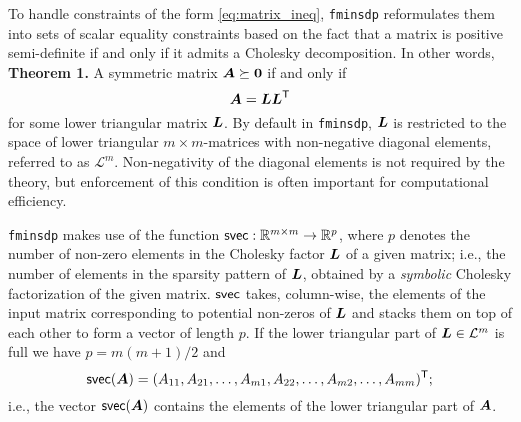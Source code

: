 \documentclass{article}
\newcommand{\bm}[1]{\mbox{\boldmath $#1$}}
\newcommand{\T}{\textsf{T}}
\newcommand{\svec}{\mbox{\textsf{svec}}}
\begin{document}
To handle constraints of the form \eqref{eq:matrix_ineq}, \texttt{fminsdp} reformulates them into sets of scalar equality constraints based on the fact that a matrix is positive semi-definite if and only if it admits a Cholesky decomposition. In other words, 
\vskip 2mm
\noindent \textbf{Theorem 1.} A symmetric matrix $\bm{A} \succeq \bm{0}$ if and only if
\begin{equation}\nonumber
\bm{A} = \bm{L}\bm{L}^{\T}
\end{equation}
for some lower triangular matrix $\bm{L}$. 
\vskip 2mm
\noindent By default in \texttt{fminsdp}, $\bm{L}$ is restricted to the space of lower triangular $m \times m$-matrices with non-negative diagonal elements, referred to as $\mathcal{L}^{m}$. Non-negativity of the diagonal elements is not required by the theory, but enforcement of this condition is often important for computational efficiency.

\texttt{fminsdp} makes use of the function $\svec : \mathbb{R}^{m\times m} \rightarrow \mathbb{R}^{p}$, where $p$ denotes the number of  non-zero elements in the Cholesky factor $\bm{L}$ of a given matrix; i.e., the number of elements in the sparsity pattern of $\bm{L}$, obtained by a \textit{symbolic} Cholesky factorization of the given matrix. $\svec$ takes, column-wise, the elements of the input matrix corresponding to potential non-zeros of $\bm{L}$ and stacks them on top of each other to form a vector of length $p$. If the lower triangular part of $\bm{L}\in\mathcal{L}^{m}$ is full we have $p=m(m+1)/2$ and
\begin{equation}\nonumber
\svec(\bm{A}) = (A_{11},A_{21},\ldots,A_{m1},A_{22},\ldots,A_{m2},\ldots,A_{mm})^{\T};
\end{equation}
i.e., the vector $\svec(\bm{A})$ contains the elements of the lower triangular part of $\bm{A}$. 
\end{document}
